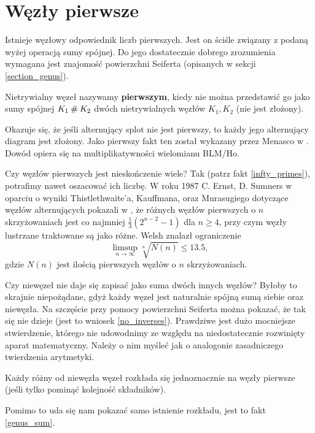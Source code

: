 \section{Węzły pierwsze}
\label{sec:prime_knots}
Istnieje węzłowy odpowiednik liczb pierwszych.
Jest on ściśle związany z podaną wyżej operacją sumy spójnej.
Do jego dostatecznie dobrego zrozumienia wymagana jest znajomość powierzchni Seiferta (opisanych w sekcji \ref{section_genus}).

\begin{definition} \label{primeknot}
    Nietrywialny węzeł nazywamy \textbf{pierwszym},
    kiedy nie można przedstawić go jako sumy spójnej $K_1 \mathbin{\#} K_2$
    dwóch nietrywialnych węzłów $K_1, K_2$ (nie jest złożony).
\end{definition}

Okazuje się, że jeśli alternujący  splot nie jest pierwszy,
to każdy jego alternujący diagram jest złożony.
Jako pierwszy fakt ten został wykazany przez Menasco w \cite{menasco84}.
Dowód opiera się na multiplikatywności wielomianu BLM/Ho.


Czy węzłów pierwszych jest nieskończenie wiele?
Tak (patrz fakt \ref{infty_primes}), potrafimy nawet oszacować ich liczbę.
W roku 1987 C. Ernst, D. Sumners w oparciu o wyniki Thistlethwaite'a, Kauffmana, oraz Murasugiego dotyczące węzłów alternujących pokazali w \cite{ernst87},
że różnych węzłów pierwszych o $n$ skrzyżowaniach jest co najmniej $\frac 1 3 (2^{n- 2} - 1)$ dla $n \ge 4$,
przy czym węzły lustrzane traktowane są jako różne.
Welsh znalazł ograniczenie
\[
    \limsup_{n \to \infty} \sqrt[n]{N(n)} \le 13.5,
\]
gdzie $N(n)$ jest ilością pierwszych węzłów o $n$ skrzyżowaniach.

Czy niewęzeł nie daje się zapisać jako suma dwóch innych węzłów?
Byłoby to skrajnie niepożądane, gdyż każdy węzeł jest naturalnie spójną sumą siebie oraz niewęzła.
Na szczęście przy pomocy powierzchni Seiferta można pokazać, że tak się nie dzieje (jest to wniosek \ref{no_inverses}).
Prawdziwe jest dużo mocniejsze stwierdzenie,
którego nie udowodnimy ze względu na niedostatecznie rozwinięty aparat matematyczny.
Należy o nim myśleć jak o analogonie zasadniczego twierdzenia arytmetyki.

\begin{theorem}[Schubert, 1949]
    Każdy różny od niewęzła węzeł rozkłada się jednoznacznie na węzły pierwsze
    (jeśli tylko pominąć kolejność składników).
\end{theorem}

Pomimo to uda się nam pokazać samo istnienie rozkładu, jest to fakt \ref{genus_sum}.
